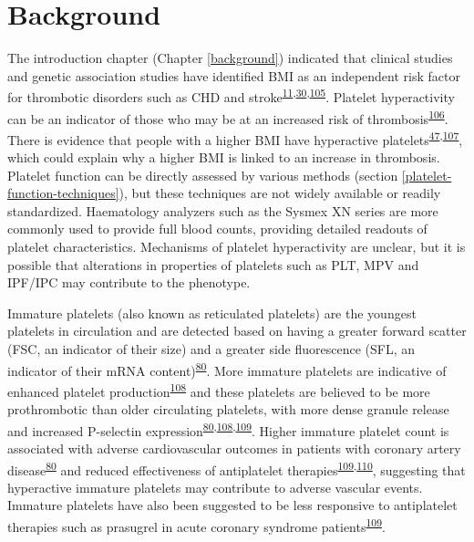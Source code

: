 \documentclass[11pt,twoside]{bristolthesis}
\begin{document}
\hypertarget{background-1}{%
\section{Background}\label{background-1}}

The introduction chapter (Chapter \ref{background}) indicated that clinical studies and genetic association studies have identified BMI as an independent risk factor for thrombotic disorders such as CHD and stroke\textsuperscript{\protect\hyperlink{ref-Nordestgaard2012}{11},\protect\hyperlink{ref-Dale2017}{30},\protect\hyperlink{ref-Wolk2003a}{105}}. Platelet hyperactivity can be an indicator of those who may be at an increased risk of thrombosis\textsuperscript{\protect\hyperlink{ref-Puurunen2018}{106}}. There is evidence that people with a higher BMI have hyperactive platelets\textsuperscript{\protect\hyperlink{ref-Nardin2015}{47},\protect\hyperlink{ref-Barrachina2019}{107}}, which could explain why a higher BMI is linked to an increase in thrombosis. Platelet function can be directly assessed by various methods (section \ref{platelet-function-techniques}), but these techniques are not widely available or readily standardized. Haematology analyzers such as the Sysmex XN series are more commonly used to provide full blood counts, providing detailed readouts of platelet characteristics. Mechanisms of platelet hyperactivity are unclear, but it is possible that alterations in properties of platelets such as PLT, MPV and IPF/IPC may contribute to the phenotype.

Immature platelets (also known as reticulated platelets) are the youngest platelets in circulation and are detected based on having a greater forward scatter (FSC, an indicator of their size) and a greater side fluorescence (SFL, an indicator of their mRNA content)\textsuperscript{\protect\hyperlink{ref-Ibrahim2014}{80}}. More immature platelets are indicative of enhanced platelet production\textsuperscript{\protect\hyperlink{ref-Lev2016a}{108}} and these platelets are believed to be more prothrombotic than older circulating platelets, with more dense granule release and increased P-selectin expression\textsuperscript{\protect\hyperlink{ref-Ibrahim2014}{80},\protect\hyperlink{ref-Lev2016a}{108},\protect\hyperlink{ref-Bernlochner2015a}{109}}. Higher immature platelet count is associated with adverse cardiovascular outcomes in patients with coronary artery disease\textsuperscript{\protect\hyperlink{ref-Ibrahim2014}{80}} and reduced effectiveness of antiplatelet therapies\textsuperscript{\protect\hyperlink{ref-Bernlochner2015a}{109},\protect\hyperlink{ref-Ibrahim2012}{110}}, suggesting that hyperactive immature platelets may contribute to adverse vascular events. Immature platelets have also been suggested to be less responsive to antiplatelet therapies such as prasugrel in acute coronary syndrome patients\textsuperscript{\protect\hyperlink{ref-Bernlochner2015a}{109}}.
\end{document}

